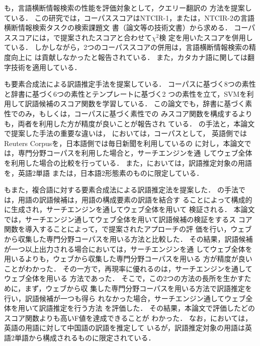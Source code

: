 \documentclass[japanese]{jnlp_1.3a}
\begin{document}
\cite{Adama04}も，言語横断情報検索の性能を評価対象として，クエリー翻訳の
方法を提案している．
この研究では，コーパススコアはNTCIR-1\cite{Kando99-NTCIR1}，または，NTCIR-2\cite{Kando01-NTCIR2-JEIR}の言語横断情報検索タスクの検索課題文
書（論文等の技術文書）から求める．
コーパススコアには，\cite{Fujii00}で提案されたスコアと合わせて$\chi^2$検
定を用いたスコアを併用している．
しかしながら，2つのコーパススコアの併用は，言語横断情報検索の精度向上に
は貢献しなかったと報告されている．
また，カタカナ語に関しては翻字技術を適用している．

\cite{Baldwin04multi}も要素合成法による訳語推定手法を提案している．
コーパスに基づく8つの素性と辞書に基づく6つの素性とテンプレートに基づく2 
つの素性を立て，SVMを利用して訳語候補のスコア関数を学習している．
この論文でも，辞書に基づく素性でのみ，もしくは，コーパスに基づく素性での
みスコア関数を構成するよりも，両者を利用した方が精度が良いことが報告され
ている．
\cite{Baldwin04multi}の手法と，本論文で提案した手法の重要な違いは，
\cite{Baldwin04multi}においては，コーパスとして，
英語側ではReuters Corpusを，日本語側では毎日新聞を利用しているの
に対し，本論文では，専門分野コーパスを利用した場合と，サーチエンジンを通
してウェブ全体を利用した場合の比較を行っている．
また，\cite{Baldwin04multi}においては，訳語推定対象の用語を，英語2単語
または，日本語2形態素のものに限定している．

\cite{Cao02as}もまた，複合語に対する要素合成法による訳語推定法を提案した．
\cite{Cao02as}の手法では，用語の訳語候補は，用語の構成要素の訳語を結合す
ることによって構成的に生成され，サーチエンジンを通してウェブ全体を用いて
検証される．
本論文では，サーチエンジン通してウェブ全体を用いて訳語候補の検証をするス
コア関数を導入することによって，\cite{Cao02as}で提案されたアプローチの評
価を行い，ウェブから収集した専門分野コーパスを用いる方法と比較した．
その結果，訳語候補が一つ以上出力される場合においては，サーチエンジンを通
してウェブ全体を用いるよりも，ウェブから収集した専門分野コーパスを用いる
方が精度が良いことがわかった．
その一方で，再現率に優れるのは，サーチエンジンを通してウェブ全体を用いる
方法であった．
そこで，この2つの方法の長所を生かすために，まず，ウェブから収
集した専門分野コーパスを用いる方法で訳語推定を行い，訳語候補が一つも得ら
れなかった場合，サーチエンジン通してウェブ全体を用いて訳語推定を行う方法
を評価した．
その結果，本論文で評価したどのスコア関数よりも高いF値を達成できることが
わかった．
なお，\cite{Cao02as}においては，英語の用語に対して中国語の訳語を推定して
いるが，訳語推定対象の用語は英語2単語から構成されるものに限定されている．
\end{document}
